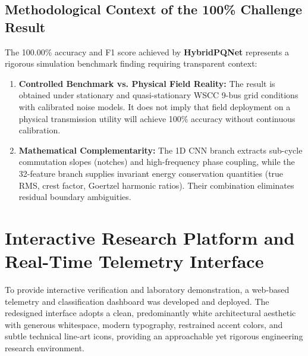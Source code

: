 \documentclass[12pt,a4paper]{report}
\begin{document}
\subsection{Methodological Context of the 100\% Challenge Result}
The 100.00\% accuracy and F1 score achieved by \textbf{HybridPQNet} represents a rigorous simulation benchmark finding requiring transparent context:
\begin{enumerate}
    \item \textbf{Controlled Benchmark vs. Physical Field Reality:} The result is obtained under stationary and quasi-stationary WSCC 9-bus grid conditions with calibrated noise models. It does not imply that field deployment on a physical transmission utility will achieve 100\% accuracy without continuous calibration.
    \item \textbf{Mathematical Complementarity:} The 1D CNN branch extracts sub-cycle commutation slopes (notches) and high-frequency phase coupling, while the 32-feature branch supplies invariant energy conservation quantities (true RMS, crest factor, Goertzel harmonic ratios). Their combination eliminates residual boundary ambiguities.
\end{enumerate}

\section{Interactive Research Platform and Real-Time Telemetry Interface}
To provide interactive verification and laboratory demonstration, a web-based telemetry and classification dashboard was developed and deployed. The redesigned interface adopts a clean, predominantly white architectural aesthetic with generous whitespace, modern typography, restrained accent colors, and subtle technical line-art icons, providing an approachable yet rigorous engineering research environment.
\end{document}
